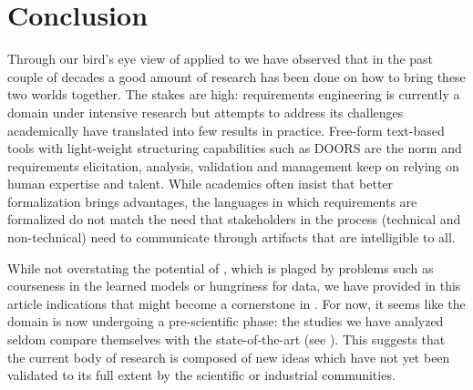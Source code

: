 \section{Conclusion}

Through our bird's eye view of \ML applied to \RE we have observed that in the
past couple of decades a good amount of research has been done on how to bring
these two worlds together. The stakes are high: requirements engineering is
currently a domain under intensive research but attempts to address its
challenges academically have translated into few results in practice. Free-form
text-based tools with light-weight structuring capabilities such as DOORS are
the norm and requirements elicitation, analysis, validation and management keep
on relying on human expertise and talent. While academics often insist that
better formalization brings advantages, the languages in which requirements are
formalized do not match the need that stakeholders in the \RE process
(technical and non-technical) need to communicate through artifacts that are
intelligible to all.

While not overstating the potential of \ML, which is plaged by problems such as
courseness in the learned models or hungriness for data, we have provided in
this article indications that \ML might become a cornerstone in \RE. For now, it
seems like the domain is now undergoing a pre-scientific phase: the studies we
have analyzed seldom compare themselves with the state-of-the-art (see
). This suggests that the current body of research is composed of
new ideas which have not yet been validated to its full extent by the scientific
or industrial communities. 
